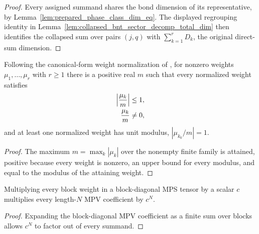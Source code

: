 \begin{proof}\leanok{}
    Every assigned summand shares the bond dimension of its representative, by
    Lemma~\ref{lem:prepared_phase_class_dim_eq}. The displayed regrouping
    identity in Lemma~\ref{lem:collapsed_bnt_sector_decomp_total_dim} then
    identifies the collapsed sum over pairs $(j,q)$ with $\sum_{k=1}^{r}D_k$,
    the original direct-sum dimension.
\end{proof}

\begin{lemma}%
    \label{thm:paperbnt_weight_normalization}
    \leanok
    Following the canonical-form weight normalization of
    \cite[line~246]{Cirac2016MPDO_arXiv}, for nonzero weights
    $\mu_1,\ldots,\mu_r$ with $r\geq1$ there is a positive real $m$ such that
    every normalized weight satisfies
    \begin{align}
        \Bigl|\frac{\mu_k}{m}\Bigr| & \leq1,
        \notag                               \\
        \frac{\mu_k}{m}             & \neq0,
        \notag
    \end{align}
    and at least one normalized weight has unit modulus,
    $|\mu_{k_0}/m|=1$.
\end{lemma}

\begin{proof}\leanok
    The maximum $m=\max_k|\mu_k|$ over the nonempty finite family is attained,
    positive because every weight is nonzero, an upper bound for every modulus,
    and equal to the modulus of the attaining weight.
\end{proof}

\begin{lemma}%
    \label{lem:mpv_to_tensor_from_blocks_weight_mul_left}
    \leanok
    Multiplying every block weight in a block-diagonal MPS tensor by a scalar
    $c$ multiplies every length-$N$ MPV coefficient by $c^N$.
\end{lemma}

\begin{proof}\leanok
    Expanding the block-diagonal MPV coefficient as a finite sum over blocks
    allows $c^N$ to factor out of every summand.
\end{proof}
